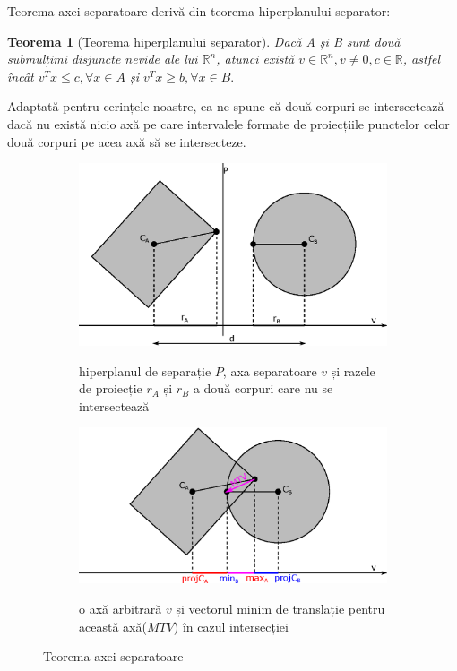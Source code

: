 \documentclass[12pt,a4paper]{report}
\newtheorem{theorem}{Teorema}[]
\begin{document}
Teorema axei separatoare derivă din teorema hiperplanului separator:
\begin{theorem}[Teorema hiperplanului separator]
	Dacă A și B sunt două submulțimi disjuncte nevide ale lui $\mathbb{R}^n$, atunci există $v\in\mathbb{R}^n, v\neq0, c\in\mathbb{R}$, astfel încât $v^{T}x\leq c, \forall x\in A$ și $v^{T}x\geq b, \forall x\in B.$
\end{theorem}
Adaptată pentru cerințele noastre, ea ne spune că două corpuri se intersectează dacă nu există nicio axă pe care intervalele formate de proiecțiile punctelor celor două corpuri pe acea axă să se intersecteze.
\begin{figure}
	\centering
	\begin{subfigure}[th]{0.49\textwidth}
		\centering
		\includegraphics[width=\textwidth]{pics/cap3_01.eps}
		\label{fig:cap3_01}
		\caption{hiperplanul de separație $P$, axa separatoare $v$ și razele de proiecție $r_A$ și $r_B$ a două corpuri care nu se intersectează}
		\vfill
	\end{subfigure}
	\hfill
	\begin{subfigure}[t]{0.49\textwidth}
		\centering
		\includegraphics[width=\textwidth]{pics/cap3_02.eps}
		\label{fig:cap3_02}
		\caption{o axă arbitrară $v$ și vectorul minim de translație pentru această axă($MTV$) în cazul intersecției}
	\end{subfigure}
	\caption{Teorema axei separatoare}
\end{figure}
\end{document}
